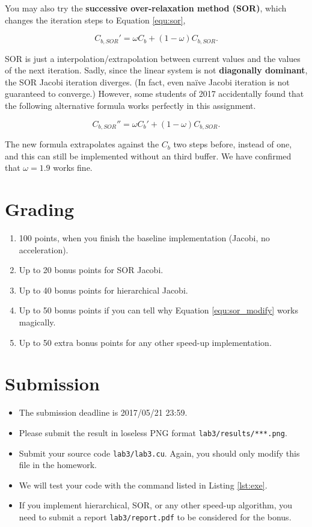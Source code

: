 \documentclass[12pt,a4paper]{article}
\newcommand{\equref}[1]{Equation \ref{equ:#1}}
\newcommand{\lstref}[1]{Listing \ref{lst:#1}}
\begin{document}
You may also try the \textbf{successive over-relaxation method (SOR)},
which changes the iteration steps to \equref{sor},

\begin{equation}
C_{b,SOR}' = \omega C_b + (1-\omega) C_{b,SOR}.
\label{equ:sor}
\end{equation}

SOR is just a interpolation/extrapolation between
current values and the values of the next iteration.
Sadly, since the linear system is not \textbf{diagonally dominant},
the SOR Jacobi iteration diverges.
(In fact, even na\"ive Jacobi iteration is not guaranteed to converge.)
However, some students of 2017 accidentally found that the following
alternative formula works perfectly in this assignment.

\begin{equation}
C_{b,SOR}'' = \omega C_b' + (1-\omega) C_{b,SOR}.
\label{equ:sor_modify}
\end{equation}

The new formula extrapolates against the $C_b$ two steps before,
instead of one, and this can still be implemented without an third buffer.
We have confirmed that $\omega = 1.9$ works fine.
 
\section{Grading}
\begin{enumerate}
\item 100 points, when you finish the baseline implementation (Jacobi, no acceleration).
\item Up to 20 bonus points for SOR Jacobi.
\item Up to 40 bonus points for hierarchical Jacobi.
\item Up to 50 bonus points if you can tell why Equation \ref{equ:sor_modify} works magically.
\item Up to 50 extra bonus points for any other speed-up implementation.
\end{enumerate}

\section{Submission}
\begin{itemize}
\item The submission deadline is 2017/05/21 23:59.
\item Please submit the result in loseless PNG format \verb+lab3/results/***.png+.
\item Submit your source code \verb+lab3/lab3.cu+. Again, you should only modify this file in the homework.
\item We will test your code with the command listed in \lstref{exe}.
\item If you implement hierarchical, SOR, or any other speed-up algorithm, you need to submit a report \verb+lab3/report.pdf+ to be considered for the bonus.
\end{itemize}
\end{document}
